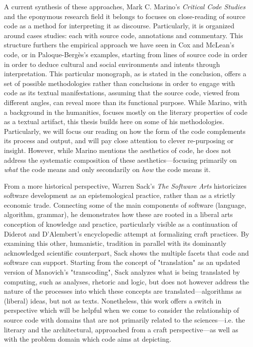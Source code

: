 A current synthesis of these approaches, Mark C. Marino's \emph{Critical Code Studies} \citep{marino_critical_2020} and the eponymous research field it belongs to focuses on close-reading of source code as a method for interpreting it as discourse. Particularly, it is organized around cases studies: each with source code, annotations and commentary. This structure furthers the empirical approach we have seen in Cox and McLean's code, or in Paloque-Bergès's examples, starting from lines of source code in order in order to deduce cultural and social environments and intents through interpretation. This particular monograph, as is stated in the conclusion, offers a set of possible methodologies rather than conclusions in order to engage with code as its textual manifestations, assuming that the source code, viewed from different angles, can reveal more than its functional purpose. While Marino, with a background in the humanities, focuses mostly on the literary properties of code as a textual artifact, this thesis builds here on some of his methodologies. Particularly, we will focus our reading on how the form of the code complements its process and output, and will pay close attention to clever re-purposing or insight. However, while Marino mentions the aesthetics of code, he does not address the systematic composition of these aesthetics—focusing primarily on \emph{what} the code means and only secondarily on \emph{how} the code means it.

From a more historical perspective, Warren Sack's \emph{The Software Arts} \citep{sack_software_2019} historicizes software development as an epistemological practice, rather than as a strictly economic trade. Connecting some of the main components of software (language, algorithm, grammar), he demonstrates how these are rooted in a liberal arts conception of knowledge and practice, particularly visible as a continuation of Diderot and D'Alembert's encyclopedic attempt at formalizing craft practices. By examining this other, humanistic, tradition in parallel with its dominantly acknowledged scientific counterpart, Sack shows the multiple facets that code and software can support. Starting from the concept of "translation" as an updated version of Manovich's "transcoding", Sack analyzes what is being translated by computing, such as analyses, rhetoric and logic, but does not however address the nature of the processes into which these concepts are translated—algorithms as (liberal) ideas, but not as texts. Nonetheless, this work offers a switch in perspective which will be helpful when we come to consider the relationship of source code with domains that are not primarily related to the sciences—i.e. the literary and the architectural, approached from a craft perspective—as well as with the problem domain which code aims at depicting.

